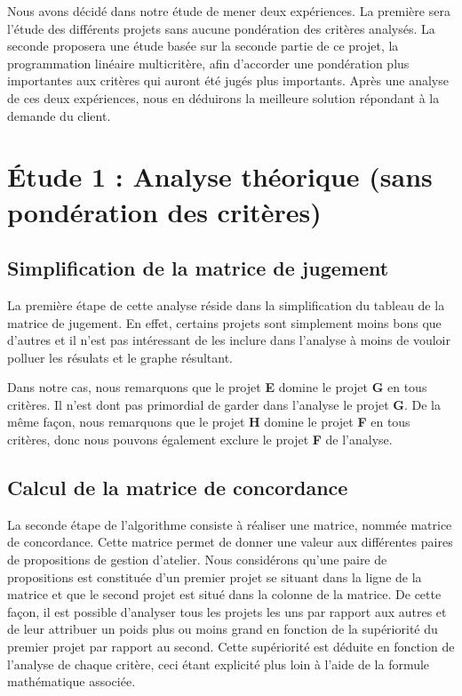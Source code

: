 \documentclass[a4paper,10pt]{article}
\begin{document}
Nous avons décidé dans notre étude de mener deux expériences. La première sera l'étude des différents projets sans aucune pondération des critères analysés. La seconde proposera une étude basée sur la seconde partie de ce projet, la programmation linéaire multicritère, afin d'accorder une pondération plus importantes aux critères qui auront été jugés plus importants. Après une analyse de ces deux expériences, nous en déduirons la meilleure solution répondant à la demande du client.

\section{Étude 1 : Analyse théorique (sans pondération des critères)}

\subsection{Simplification de la matrice de jugement}

La première étape de cette analyse réside dans la simplification du tableau de la matrice de jugement. En effet, certains projets sont simplement moins bons que d'autres et il n'est pas intéressant de les inclure dans l'analyse à moins de vouloir polluer les résulats et le graphe résultant.

Dans notre cas, nous remarquons que le projet \textbf{E} domine le projet \textbf{G} en tous critères. Il n'est dont pas primordial de garder dans l'analyse le projet \textbf{G}. De la même façon, nous remarquons que le projet \textbf{H} domine le projet \textbf{F} en tous critères, donc nous pouvons également exclure le projet \textbf{F} de l'analyse.


\subsection{Calcul de la matrice de concordance}

La seconde étape de l'algorithme consiste à réaliser une matrice, nommée matrice de concordance. Cette matrice permet de donner une valeur aux différentes paires de propositions de gestion d'atelier. Nous considérons qu'une paire de propositions est constituée d'un premier projet se situant dans la ligne de la matrice et que le second projet est situé dans la colonne de la matrice. De cette façon, il est possible d'analyser tous les projets les uns par rapport aux autres et de leur attribuer un poids plus ou moins grand en fonction de la supériorité du premier projet par rapport au second. Cette supériorité est déduite en fonction de l'analyse de chaque critère, ceci étant explicité plus loin à l'aide de la formule mathématique associée. 
\end{document}
